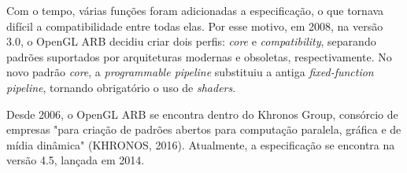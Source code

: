 Com o tempo, várias funções foram adicionadas a especificação, o que tornava difícil a compatibilidade entre todas elas. Por esse motivo, em 2008, na versão 3.0, o OpenGL ARB decidiu criar dois perfis: \textit{core} e \textit{compatibility}, separando padrões suportados por arquiteturas modernas e obsoletas, respectivamente. No novo padrão \textit{core}, a \textit{programmable pipeline} substituiu a antiga \textit{fixed-function pipeline}, tornando obrigatório o uso de \textit{shaders}.

Desde 2006, o OpenGL ARB se encontra dentro do Khronos Group, consórcio de empresas "para criação de padrões abertos para computação paralela, gráfica e de mídia dinâmica" (KHRONOS, 2016). Atualmente, a especificação se encontra na versão 4.5, lançada em 2014.